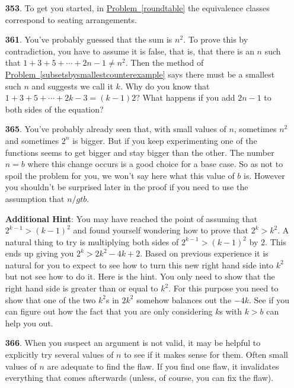 \documentclass[10pt,]{book}
\theoremstyle{plain}
\theoremstyle{definition}
\theoremstyle{definition}
\numberwithin{equation}{chapter}
\newcommand{\gt}{>}
\begin{document}
\begin{itemize}[itemsep=1em]
\item[\textbf{353}.]\hypertarget{p-1955}{}%
To get you started, in \hyperref[roundtable]{Problem~\ref{roundtable}} the equivalence classes correspond to seating arrangements.%

\item[\textbf{361}.]\hypertarget{p-1988}{}%
You've probably guessed that the sum is \(n^2\). To prove this by contradiction, you have to assume it is false, that is, that there is an \(n\) such that \(1 + 3 + 5 + \cdots + 2n - 1 \ne n^2\). Then the method of \hyperref[subsetsbysmallestcounterexample]{Problem~\ref{subsetsbysmallestcounterexample}} says there must be a smallest such \(n\) and suggests we call it \(k\). Why do you know that \(1 + 3 + 5 + \cdots + 2k - 3 = (k-1)2\)? What happens if you add \(2n-1\) to both  sides of the equation?%

\item[\textbf{365}.]\hypertarget{p-2012}{}%
You've probably already seen that, with small values of \(n\), sometimes \(n^2\) and sometimes \(2^n\) is bigger. But if you keep experimenting one of the functions  seems to get bigger and stay bigger than the other. The number \(n=b\) where this change occurs is a good choice for a base case. So as not to spoil the problem for you, we won't say here what this value of \(b\) is. However you    shouldn't be surprised later in the proof if you need to use the assumption that \(n /gt b\).%

\par\smallskip
\noindent\textbf{Additional Hint}: \hypertarget{p-2013}{}%
You may have reached the point of assuming that \(2^{k-1} \gt (k-1)^2\) and found yourself wondering how to prove that \(2^k \gt k^2\). A natural thing to try is multiplying both sides of \(2^{k-1} \gt (k-1)^2\) by \(2\). This ends up giving you \(2^k \gt 2k^2 - 4k +2\). Based on previous experience it is natural for you to expect to see how to turn this new right hand side into \(k^2\) but not see how to do it. Here is the hint. You only need to show that the right hand side is greater than or equal to \(k^2\). For this purpose you need to show that one of the two \(k^2\)s in \(2k^2\) somehow balances out the \(-4k\). See if you can figure out how the fact that you are only considering \(k\)s with \(k \gt b\) can help you out.%

\item[\textbf{366}.]\hypertarget{p-2016}{}%
When you suspect an argument is not valid, it may be helpful to explicitly try several values of \(n\) to see if it makes sense for them. Often small values of \(n\) are adequate to find the flaw. If you find one flaw, it invalidates everything that comes afterwards (unless, of course, you can fix the flaw).%


\end{itemize}
\end{document}
